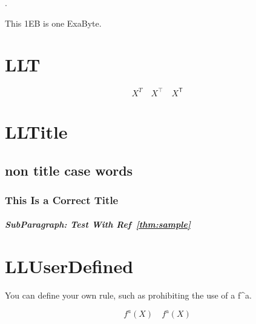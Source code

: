 \documentclass[a4paper, 10pt]{article}
\begin{document}
\EB.

This 1EB is one ExaByte.

\section{LLT}

\begin{equation*}
	X^T \quad X^\top \quad X^{\mathsf{T}}
\end{equation*}

\section{LLTitle}

\subsection{non title case words}

\subsubsection{
	This Is a Correct Title
}

\subparagraph{SubParagraph: Test With Ref~\ref{thm:sample}}

\section{LLUserDefined}

You can define your own rule, such as prohibiting the use of a f\^{}a.

\begin{equation*}
	f^a(X) \quad f^{\mathrm{a}}(X)
\end{equation*}
\end{document}
